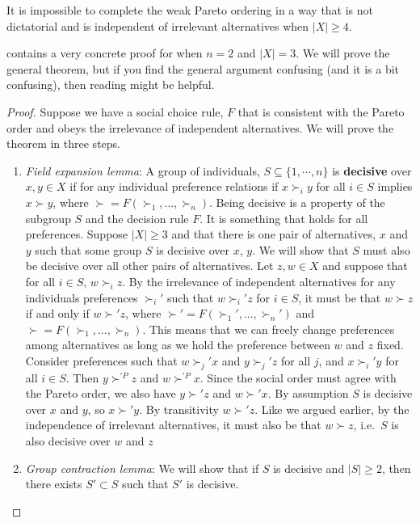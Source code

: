 \begin{theorem}
  It is impossible to complete the weak Pareto ordering in a way that
  is not dictatorial and is independent of irrelevant alternatives
  when $|X| \geq 4$. 
\end{theorem}
\cite{feldman1974} contains a very concrete proof for when $n=2$ and
$|X|=3$. We will prove the general theorem, but if you find the
general argument confusing (and it is a bit confusing), then reading
\cite{feldman1974} might be helpful.
\begin{proof}
  Suppose we have a social choice rule, $F$ that is consistent with
  the Pareto order and obeys the irrelevance of independent
  alternatives. We will prove the theorem in three steps.
  \begin{enumerate}
  \item \emph{Field expansion lemma}: A group of individuals, $S
    \subseteq \{1,\cdots,n\}$ is \textbf{decisive} over $x, y \in X$
    if for any individual preference relations if $x \succ_i y$ for
    all $i \in S$ implies $x \succ y$, where $\succ=F(\succ_1,...,
    \succ_n)$. Being decisive is a property of the subgroup $S$ and
    the decision rule $F$. It is something that holds for all
    preferences. Suppose $|X|\geq 3$ and that there is one pair of
    alternatives, $x$ and $y$ such that some group $S$ is decisive
    over $x$, $y$.  We will show that $S$ must also be decisive over
    all other pairs of alternatives.  Let $z, w\in X$ and suppose that
    for all $i \in S$, $w \succ_i z$. By the irrelevance of
    independent alternatives for any individuals preferences
    $\succ_i'$ such that $w \succ_i' z$ for $i \in S$, it must be that $w \succ z$ if
    and only if $w \succ' z$, where $\succ'=F(\succ_1',...,\succ_n')$
    and $\succ=F(\succ_1,...,\succ_n)$.  This means that we can freely
    change preferences among alternatives as long as we hold the
    preference between $w$ and $z$ fixed. Consider preferences such
    that $w \succ_j' x$ and $y \succ_j' z$ for all $j$, and $x \succ_i'
    y$ for all $i \in S$. Then $y \succ^{'P} z$ and $w \succ^{'P} x$. Since
    the social order must agree with the Pareto order, we also have $y
    \succ' z$ and $w \succ' x$. By assumption $S$ is decisive over
    $x$ and $y$, so $x \succ' y$. By transitivity $w \succ' z$. Like we argued earlier,
    by the independence of irrelevant alternatives, it must also be
    that $w \succ z$, i.e.\ $S$ is also decisive over $w$ and $z$
  \item \emph{Group contraction lemma}: We will show that if $S$ is
    decisive and $|S| \geq 2$, then there exists $S' \subset S$ such
    that $S'$ is decisive. 
    

\end{enumerate}
\end{proof}

